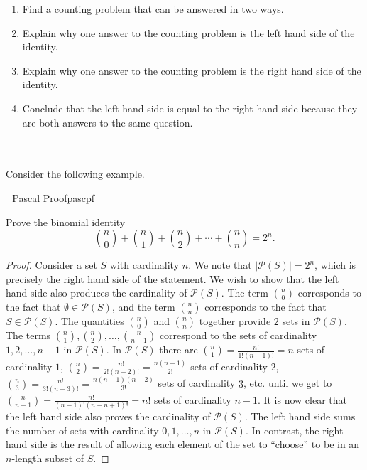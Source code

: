     \begin{enumerate}
        \item Find a counting problem that can be answered in two ways.
        \item Explain why one answer to the counting problem is the left hand side of the identity.
        \item Explain why one answer to the counting problem is the right hand side of the identity.
        \item Conclude that the left hand side is equal to the right hand side because they are both answers to the same question.
    \end{enumerate}
    \vphantom
    \\
    \\
    Consider the following example.
    \begin{example}{\Difficulty\,\Difficulty\,\Difficulty\,\,Pascal Proof}{pascpf}
    
        Prove the binomial identity
        \begin{equation*}
            \binom{n}{0}+\binom{n}{1}+\binom{n}{2}+\cdots+\binom{n}{n}=2^n.
        \end{equation*}
        \begin{proof}
            Consider a set \(S\) with cardinality \(n\). We note that \(|\mathcal{P}(S)|=2^n\), which is precisely the right hand side of the statement. We wish to show that the left hand side also produces the cardinality of \(\mathcal{P}(S)\). The term \(\binom{n}{0}\) corresponds to the fact that \(\emptyset\in\mathcal{P}(S)\), and the term \(\binom{n}{n}\) corresponds to the fact that \(S\in\mathcal{P}(S)\). The quantities \(\binom{n}{0}\) and \(\binom{n}{n}\) together provide \(2\) sets in \(\mathcal{P}(S)\). The terms \(\binom{n}{1},\binom{n}{2},\ldots,\binom{n}{n-1}\) correspond to the sets of cardinality \(1,2,\ldots,n-1\) in \(\mathcal{P}(S)\). In \(\mathcal{P}(S)\) there are \(\binom{n}{1}=\frac{n!}{1!(n-1)!}=n\) sets of cardinality \(1\), \(\binom{n}{2}=\frac{n!}{2!(n-2)!}=\frac{n(n-1)}{2!}\) sets of cardinality \(2\), \(\binom{n}{3}=\frac{n!}{3!(n-3)!}=\frac{n(n-1)(n-2)}{3!}\) sets of cardinality \(3\), etc. until we get to \(\binom{n}{n-1}=\frac{n!}{(n-1)!(n-n+1)!}=n!\) sets of cardinality \(n-1\). It is now clear that the left hand side also proves the cardinality of \(\mathcal{P}(S)\). The left hand side sums the number of sets with cardinality \(0,1,\ldots,n\) in \(\mathcal{P}(S)\). In contrast, the right hand side is the result of allowing each element of the set to ``choose'' to be in an \(n\)-length subset of \(S\).
        \end{proof}
    
    \end{example}
